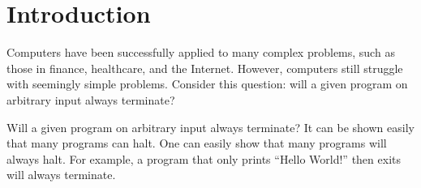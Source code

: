 \chapter{Introduction} \label{sec:introduction}










Computers have been successfully applied to many complex problems, such as those in finance, healthcare, and the Internet. However, computers still struggle with seemingly simple problems. Consider this question: will a given program on arbitrary input always terminate?

Will a given program on arbitrary input always terminate?
It can be shown easily that many programs can halt.
One can easily show that many programs will always halt. For example, a program that only prints ``Hello World!'' then exits will always terminate.

